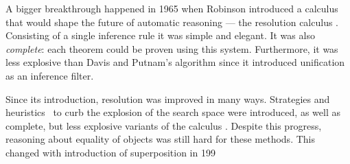 A bigger breakthrough happened in 1965 when Robinson introduced a calculus that
would shape the future of automatic reasoning --- the resolution calculus
\cite{ar-65-resolution}. Consisting of a single inference rule it was simple and
elegant. It was also \emph{complete}: each theorem could be proven using this
system. Furthermore, it was less explosive than Davis and Putnam's algorithm
since it introduced unification as an inference filter.

Since its introduction, resolution was improved in many ways. Strategies and
heuristics~\cite{lw-65-sos} to curb the explosion of the search space were
introduced, as well as complete, but less explosive variants of the calculus \cite{cc-73-resolution-book}. Despite this
progress, reasoning about equality of objects was still hard for these methods. This changed with introduction of
superposition in 199
















